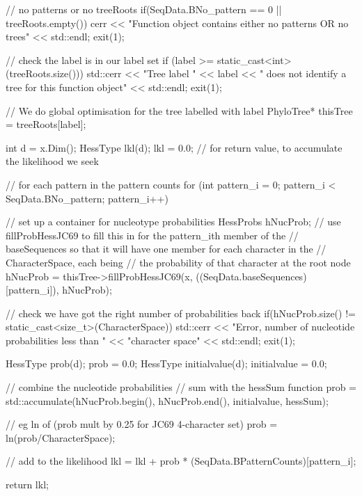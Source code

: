 \begin{DoxyCode}
{

                    // no patterns or no treeRoots
  if(SeqData.BNo_pattern == 0 || treeRoots.empty())
  {
    cerr << "Function object contains either no patterns OR no trees" 
         << std::endl;
    exit(1);
  }

  // check the label is in our label set
  if (label >= static_cast<int>(treeRoots.size()))
  {
    std::cerr << "Tree label " << label
      << " does not identify a tree for this function object" << std::endl;
    exit(1);
  }

  // We do global optimisation for the tree labelled with label
  PhyloTree* thisTree = treeRoots[label];

  int d = x.Dim();
  HessType lkl(d);
  lkl = 0.0;        // for return value, to accumulate the likelihood we seek

  // for each pattern in the pattern counts
  for (int pattern_i = 0; pattern_i < SeqData.BNo_pattern; pattern_i++)
  {

    // set up a container for nucleotype probabilities
    HessProbs hNucProb;
    // use fillProbHessJC69 to fill this in for the pattern_ith member of the 
    // baseSequences so that it will have one member for each character in the 
    // CharacterSpace, each being
    // the probability of that character at the root node
    hNucProb = 
      thisTree->fillProbHessJC69(x, ((SeqData.baseSequences)[pattern_i]), 
                                 hNucProb);

    // check we have got the right number of probabilities back
    if(hNucProb.size() != static_cast<size_t>(CharacterSpace))
    {
      std::cerr << "Error, number of nucleotide probabilities less than " 
                << "character space" << std::endl;
      exit(1);
    }

    HessType prob(d);
    prob = 0.0;
    HessType initialvalue(d);
    initialvalue = 0.0;

    // combine the nucleotide probabilities
                    // sum with the hessSum function
    prob = std::accumulate(hNucProb.begin(), hNucProb.end(), 
                           initialvalue, hessSum);

    // eg ln of (prob mult by 0.25 for JC69 4-character set)
    prob = ln(prob/CharacterSpace);

    // add to the likelihood
    lkl = lkl + prob * (SeqData.BPatternCounts)[pattern_i];
  }

  return lkl;
}
\end{DoxyCode}
